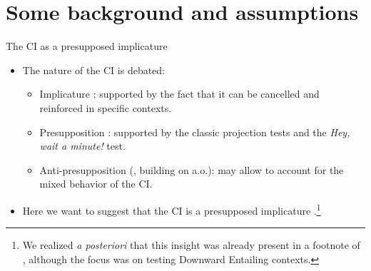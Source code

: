 \documentclass[10pt]{beamer}
\begin{document}
\section[Some background]{Some background and assumptions}
	
\begin{frame}{The CI as a presupposed implicature}
	\begin{itemize}
		\item The nature of the CI is debated:
		\begin{itemize}
			\item Implicature \cite{Iatridou2000,Ippolito2003} : supported by the fact that it can be cancelled and reinforced in specific contexts.
			\item Presupposition \cite{vonFintel1998,Karawani2014} : supported by the classic projection tests and the \textit{Hey, wait a minute!} test.
			\item Anti-presupposition (\cite{Leahy2011, Leahy2018}, building on \cite{Heim1991,Sauerland2003,Percus2006} a.o.): may allow to account for the mixed behavior of the CI.
		\end{itemize}
		\item Here we want to suggest that the CI is a presupposed implicature \cite{Bassi2021}.\footnote{We realized \textit{a posteriori} that this insight was already present in a footnote of \cite{Bassi2021}, although the focus was on testing Downward Entailing contexts.}
	\end{itemize}
\end{frame}
\end{document}
